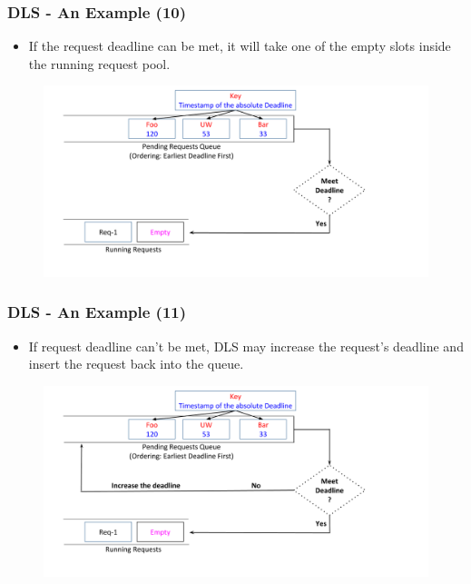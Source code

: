 \documentclass{beamer}
\begin{document}
\begin{frame}
  \frametitle{DLS - An Example (10)}
  \begin{itemize}
  \item If the request deadline can be met, it will take one of the empty slots
    inside the running request pool.
    \newline
  \end{itemize}
  \begin{figure}
    \begin{center}
      \centerline{\includegraphics[scale=0.33]{img/DLS_Example8_4.png}}
    \end{center}
  \end{figure}
\end{frame}



\begin{frame}
  \frametitle{DLS - An Example (11)}
  \begin{itemize}
  \item If request deadline can't be met, DLS may increase the request's
    deadline and insert the request back into the queue.
    \newline
  \end{itemize}
  \begin{figure}
    \begin{center}
      \centerline{\includegraphics[scale=0.33]{img/DLS_Example8_5.png}}
    \end{center}
  \end{figure}
\end{frame}
\end{document}
